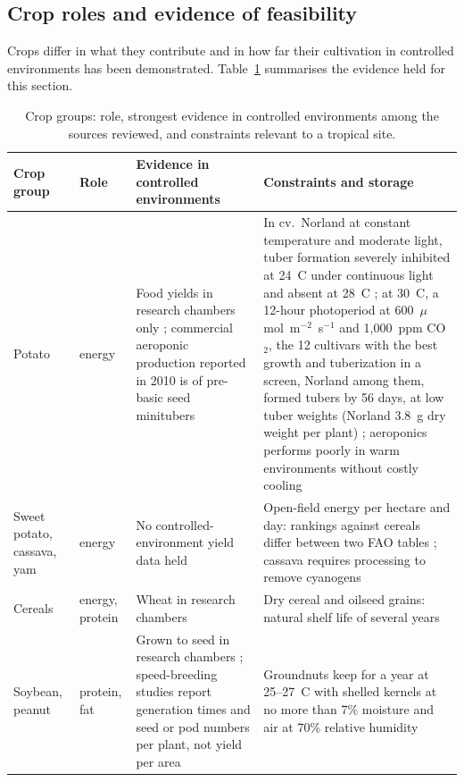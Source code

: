 \subsection{Crop roles and evidence of feasibility}\label{sec:nutrition-crops}

Crops differ in what they contribute and in how far their cultivation in controlled environments has been demonstrated. Table~\ref{tab:nutrition-crops} summarises the evidence held for this section.

\begin{table}[H]
\centering
\caption{Crop groups: role, strongest evidence in controlled environments among the sources reviewed, and constraints relevant to a tropical site.}
\label{tab:nutrition-crops}
\small
\begin{tabular}{p{2.3cm}p{2.6cm}p{5.2cm}p{5.2cm}}
\toprule
Crop group & Role & Evidence in controlled environments & Constraints and storage \\
\midrule
Potato & energy & Food yields in research chambers only \cite{wheeler2008crop,wheeler2006potato,tibbitts1994potato}; commercial aeroponic production reported in 2010 is of pre-basic seed minitubers \cite[p.~5]{cip2010aeroponics} & In cv.\ Norland at constant temperature and moderate light, tuber formation severely inhibited at 24~\textdegree{}C under continuous light and absent at 28~\textdegree{}C \cite[p.~v; pp.~71--76]{tibbitts1994potato}; at 30~\textdegree{}C, a 12-hour photoperiod at 600~$\mu$mol~m$^{-2}$~s$^{-1}$ and 1{,}000~ppm CO$_2$, the 12 cultivars with the best growth and tuberization in a screen, Norland among them, formed tubers by 56 days, at low tuber weights (Norland 3.8~g dry weight per plant) \cite[pp.~85--87]{tibbitts1994potato}; aeroponics performs poorly in warm environments without costly cooling \cite[p.~8]{cip2010aeroponics} \\
Sweet potato, cassava, yam & energy & No controlled-environment yield data held & Open-field energy per hectare and day: rankings against cereals differ between two FAO tables \cite[Table~4.1, p.~38; Table~9.3, p.~127]{fao1990roots}; cassava requires processing to remove cyanogens \cite[pp.~89--98]{fao1990roots} \\
Cereals & energy, protein & Wheat in research chambers \cite{wheeler2008crop,bugbee1988limits} & Dry cereal and oilseed grains: natural shelf life of several years \cite[Table~1.3]{fao1998rootsstorage} \\
Soybean, peanut & protein, fat & Grown to seed in research chambers \cite[p.~708; Table~2, p.~711]{wheeler2008crop}\cite[Table~2, p.~333]{mortley2001peanut}; speed-breeding studies report generation times and seed or pod numbers per plant, not yield per area \cite[Abstract; p.~6]{jahne2020speed}\cite[Abstract, p.~107; Table~1, p.~110]{oconnor2013peanut} & Groundnuts keep for a year at 25--27~\textdegree{}C with shelled kernels at no more than 7\% moisture and air at 70\% relative humidity \cite[Section~4]{waliyar2015aflatoxin} \\

\end{tabular}
\end{table}
